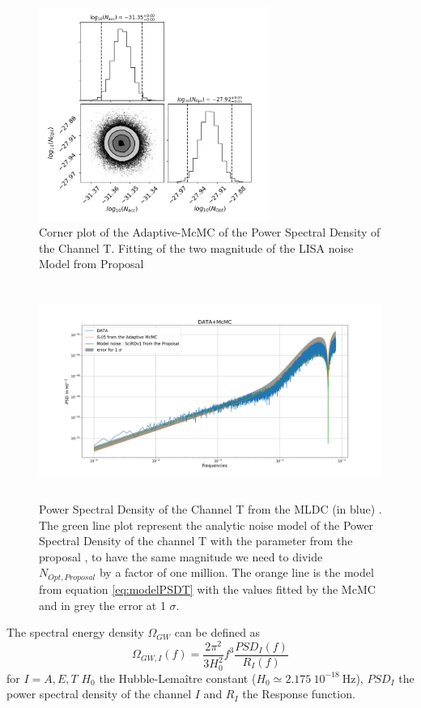 \documentclass[a4paper,12pt]{article}
\begin{document}
\begin{figure}[H]
    \centering
    \includegraphics[height= 7cm]{PSD_T/corners.png}
    \caption{Corner plot of the Adaptive-McMC of the Power Spectral Density of the Channel T. Fitting of the two magnitude of the LISA noise Model from Proposal \cite{LSR}}
    \label{fig:corner_PSDT}
\end{figure}

\begin{figure}[H]
    \centering
    \includegraphics[height= 7cm]{PSD_T/Data+McMC.png}
    \caption{Power Spectral Density of the Channel T from the MLDC (in blue) \cite{LDCM}. The green line plot represent the analytic noise model of the Power Spectral Density of the channel T with the parameter from the proposal \cite{LSR}, to have the same magnitude we need to divide $N_{Opt,Proposal}$ by a factor of one million. The orange line is the model from equation \ref{eq:modelPSDT} with the values fitted by the McMC and in grey the error at 1 $\sigma$. }
    \label{fig:MCMC_PSDT}
\end{figure}



The spectral energy density $\Omega_{GW}$ can be defined as 
\begin{equation}
	\Omega_{GW,I}(f) = \frac{2 \pi^2 }{3 H_0^2}f^3 \frac{PSD_I(f)}{R_I(f)}
\end{equation}
for $I=A,E,T$ $H_0$ the Hubble-Lemaître constant ($H_0 \simeq 2.175 \ 10^{-18}  \ \text{Hz}$), $PSD_I$ the power spectral density of the channel $I$ and $R_I$ the Response function. 
\end{document}
